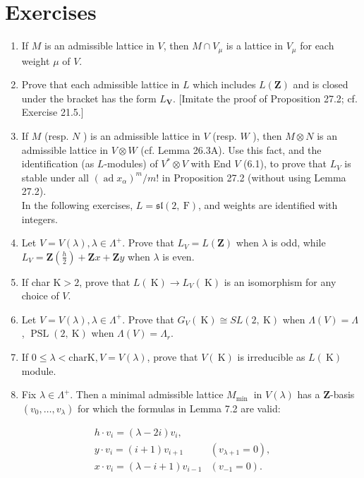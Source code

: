 \documentclass[10pt]{article}
\begin{document}
\section*{Exercises}
\begin{enumerate}
  \item If $M$ is an admissible lattice in $V$, then $M \cap V_{\mu}$ is a lattice in $V_{\mu}$ for each weight $\mu$ of $V$.
  \item Prove that each admissible lattice in $L$ which includes $L(\mathbf{Z})$ and is closed under the bracket has the form $L_{\boldsymbol{V}}$. [Imitate the proof of Proposition 27.2; cf. Exercise 21.5.]
  \item If $M$ (resp. $N$ ) is an admissible lattice in $V$ (resp. $W$ ), then $M \otimes N$ is an admissible lattice in $V \otimes W$ (cf. Lemma 26.3A). Use this fact, and the identification (as $L$-modules) of $V^{*} \otimes V$ with End $V$ (6.1), to prove that $L_{V}$ is stable under all $\left(\operatorname{ad} x_{\alpha}\right)^{m} / m!$ in Proposition 27.2 (without using Lemma 27.2).\\
In the following exercises, $L=\mathfrak{s l}(2, \mathrm{~F})$, and weights are identified with integers.
  \item Let $V=V(\lambda), \lambda \in \Lambda^{+}$. Prove that $L_{V}=L(\mathbf{Z})$ when $\lambda$ is odd, while $L_{V}=\mathbf{Z}\left(\frac{h}{2}\right)+\mathbf{Z} x+\mathbf{Z} y$ when $\lambda$ is even.
  \item If char $\mathrm{K}>2$, prove that $L(\mathrm{~K}) \rightarrow L_{V}(\mathrm{~K})$ is an isomorphism for any choice of $V$.
  \item Let $V=V(\lambda), \lambda \in \Lambda^{+}$. Prove that $G_{V}(\mathrm{~K}) \cong S L(2, \mathrm{~K})$ when $\Lambda(V)=\Lambda$, $\operatorname{PSL}(2, \mathrm{~K})$ when $\Lambda(V)=\Lambda_{r}$.
  \item If $0 \leq \lambda<\mathrm{charK}, V=V(\lambda)$, prove that $V(\mathrm{~K})$ is irreducible as $L(\mathrm{~K})$ module.
  \item Fix $\lambda \in \Lambda^{+}$. Then a minimal admissible lattice $M_{\text {min }}$ in $V(\lambda)$ has a $\mathbf{Z}$-basis $\left(v_{0}, \ldots, v_{\lambda}\right)$ for which the formulas in Lemma 7.2 are valid:
\end{enumerate}

$$
\begin{array}{ll}
h \cdot v_{i}=(\lambda-2 i) v_{i}, & \\
y \cdot v_{i}=(i+1) v_{i+1} & \left(v_{\lambda+1}=0\right), \\
x \cdot v_{i}=(\lambda-i+1) v_{i-1} & \left(v_{-1}=0\right) .
\end{array}
$$
\end{document}
